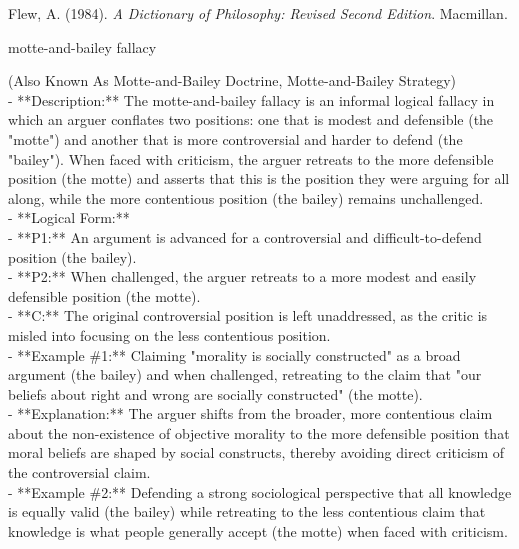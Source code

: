\documentclass[a4paper,12pt,single,pdftex]{scrbook}
\begin{document}
          Flew, A. (1984). {\it A Dictionary of Philosophy: Revised Second Edition}. Macmillan.
        
      
    
  

motte-and-bailey fallacy
    
      (Also Known As Motte-and-Bailey Doctrine, Motte-and-Bailey Strategy)
    \\

  
    
      - **Description:** The motte-and-bailey fallacy is an informal logical fallacy in which an arguer conflates two positions: one that is modest and defensible (the "motte") and another that is more controversial and harder to defend (the "bailey"). When faced with criticism, the arguer retreats to the more defensible position (the motte) and asserts that this is the position they were arguing for all along, while the more contentious position (the bailey) remains unchallenged.
    \\

    
      - **Logical Form:**
    \\

    
        - **P1:** An argument is advanced for a controversial and difficult-to-defend position (the bailey).
    \\

    
        - **P2:** When challenged, the arguer retreats to a more modest and easily defensible position (the motte).
    \\

    
        - **C:** The original controversial position is left unaddressed, as the critic is misled into focusing on the less contentious position.
    \\

    
      - **Example \#1:** Claiming "morality is socially constructed" as a broad argument (the bailey) and when challenged, retreating to the claim that "our beliefs about right and wrong are socially constructed" (the motte).
    \\

    
      - **Explanation:** The arguer shifts from the broader, more contentious claim about the non-existence of objective morality to the more defensible position that moral beliefs are shaped by social constructs, thereby avoiding direct criticism of the controversial claim.
    \\

    
      - **Example \#2:** Defending a strong sociological perspective that all knowledge is equally valid (the bailey) while retreating to the less contentious claim that knowledge is what people generally accept (the motte) when faced with criticism.
    \\
\end{document}
